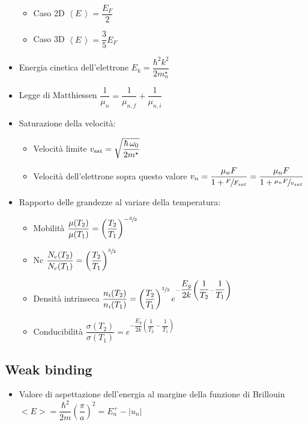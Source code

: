 \documentclass{article}
\begin{document}
\begin{itemize}
        \begin{itemize}
          \item Caso 2D \(\left<E\,\right> = \dfrac{E_F}{2} \)
          \item Caso 3D \(\left<E\,\right> = \dfrac{3}{5} E_F \)
        \end{itemize}
  \item Energia cinetica dell'elettrone \( E_k = \dfrac{\hbar^2 k^2}{2 m_n^\star} \)
  \item Legge di Matthiessen \( \dfrac{1}{\mu_n} = \dfrac{1}{\mu_{n, f}} + \dfrac{1}{\mu_{n, i}} \)
  \item Saturazione della velocità:
        \begin{itemize}
          \item Velocità limite \( v_{\textnormal{sat}} = \sqrt{\dfrac{\hbar \, \omega_{0}}{2m^\star}} \)
          \item Velocità dell'elettrone sopra questo valore \( v_n = \dfrac{\mu_n F}{1 + \sfrac{F}{F_{sat}}} = \dfrac{\mu_n F }{1 + \sfrac{\mu_n F}{v_{sat}}} \)
        \end{itemize}
  \item Rapporto delle grandezze al variare della temperatura:
        \begin{itemize}
          \item Mobilità \( \dfrac{\mu (T_2)}{\mu (T_1)} = \left( \dfrac{T_2}{T_1} \right) ^ {-\sfrac{3}{2}} \)
          \item Nc \( \dfrac{N_c (T_2)}{N_c  (T_1)} = \left( \dfrac{T_2}{T_1} \right) ^ {\sfrac{3}{2}} \)
          \item Densità intrinseca \( \dfrac{n_i (T_2)}{n_i (T_1)} = \left(\dfrac{T_2}{T_1}\right) ^ {\sfrac{3}{2}} e ^ {- \dfrac{E_g}{2 k} \left(\dfrac{1}{T_2} - \dfrac{1}{T_1} \right) } \)
          \item Conducibilità \( \dfrac{\sigma (T_2)}{\sigma (T_1)} = e ^ {- \dfrac{E_g}{2 k} \left(\dfrac{1}{T_2} - \dfrac{1}{T_1} \right) } \)
        \end{itemize}
\end{itemize}

\subsection{Weak binding}
\begin{itemize}
  \item Valore di aspettazione dell'energia al margine della funzione di Brillouin \( < E > = \dfrac{\hbar ^ 2}{2 m} \left(\dfrac{\pi}{a}\right) ^ 2 = E_n^+ - | u_n | \)
\end{itemize}
\end{document}
